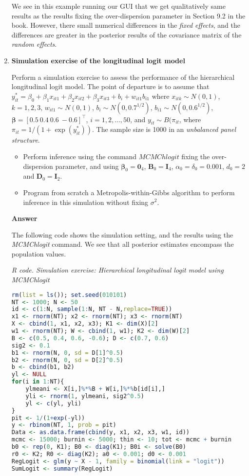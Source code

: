 \begin{enumerate}[leftmargin=*]
We see in this example running our GUI that we get qualitatively same results as the results fixing the over-dispersion parameter in Section 9.2 in the book. However, there small numerical differences in the \textit{fixed effects}, and the differences are greater in the posterior results of the covariance matrix of the \textit{random effects}.

\item \textbf{Simulation exercise of the longitudinal logit model}

Perform a simulation exercise to assess the performance of the hierarchical longitudinal logit model. The point of departure is to assume that $y_{it}^*=\beta_0+\beta_1x_{it1}+\beta_2x_{it2}+\beta_3x_{it3}+b_i+w_{it1}b_{i1}$ where $x_{itk}\sim N(0,1)$, $k=1,2,3$, $w_{it1}\sim N(0,1)$, $b_i\sim N(0, 0.7^{1/2})$, $b_{i1}\sim N(0, 0.6^{1/2})$, $\bm{\beta}=[0.5 \ 0.4 \ 0.6 \ -0.6]^{\top}$, $i=1,2,\dots,50$, and $y_{it}\sim B(\pi_{it}$, where $\pi_{it}=1/(1+\exp(y_{it}^*))$. The sample size is 1000 in an \textit{unbalanced panel structure}.

\begin{itemize}
	\item Perform inference using the command $MCMChlogit$ fixing the over-dispersion parameter, and using $\bm{\beta}_0=\bm{0}_4$, $\bm{B}_0=\bm{I}_4$, $\alpha_0=\delta_0=0.001$, $d_0=2$ and $\bm{D}_0=\bm{I}_2$.
	\item Program from scratch a Metropolis-within-Gibbs algorithm to perform inference in this simulation without fixing $\sigma^2$.  
\end{itemize}

\textbf{Answer}

The following code shows the simulation setting, and the results using the \textit{MCMChlogit} command. We see that all posterior estimates encompass the population values.

\begin{tcolorbox}[enhanced,width=4.67in,center upper,
	fontupper=\large\bfseries,drop shadow southwest,sharp corners]
	\textit{R code. Simulation exercise: Hierarchical longitudinal logit model using MCMChlogit}
	\begin{VF}
		\begin{lstlisting}[language=R]
rm(list = ls()); set.seed(010101)
NT <- 1000; N <- 50
id <- c(1:N, sample(1:N, NT - N,replace=TRUE))
x1 <- rnorm(NT); x2 <- rnorm(NT); x3 <- rnorm(NT) 
X <- cbind(1, x1, x2, x3); K1 <- dim(X)[2]
w1 <- rnorm(NT); W <- cbind(1, w1); K2 <- dim(W)[2]
B <- c(0.5, 0.4, 0.6, -0.6); D <- c(0.7, 0.6)
sig2 <- 0.1
b1 <- rnorm(N, 0, sd = D[1]^0.5)
b2 <- rnorm(N, 0, sd = D[2]^0.5)
b <- cbind(b1, b2)
yl <- NULL
for(i in 1:NT){
	ylmeani <- X[i,]%*%B + W[i,]%*%b[id[i],]
	yli <- rnorm(1, ylmeani, sig2^0.5)
	yl <- c(yl, yli)
}
pit <- 1/(1+exp(-yl))
y <- rbinom(NT, 1, prob = pit)
Data <- as.data.frame(cbind(y, x1, x2, x3, w1, id))
mcmc <- 15000; burnin <- 5000; thin <- 10; tot <- mcmc + burnin
b0 <- rep(0, K1); B0 <- diag(K1); B0i <- solve(B0) 
r0 <- K2; R0 <- diag(K2); a0 <- 0.001; d0 <- 0.001
RegLogit <- glm(y ~ X - 1, family = binomial(link = "logit"))
SumLogit <- summary(RegLogit)


\end{lstlisting}
\end{VF}
\end{tcolorbox}
\end{enumerate}
